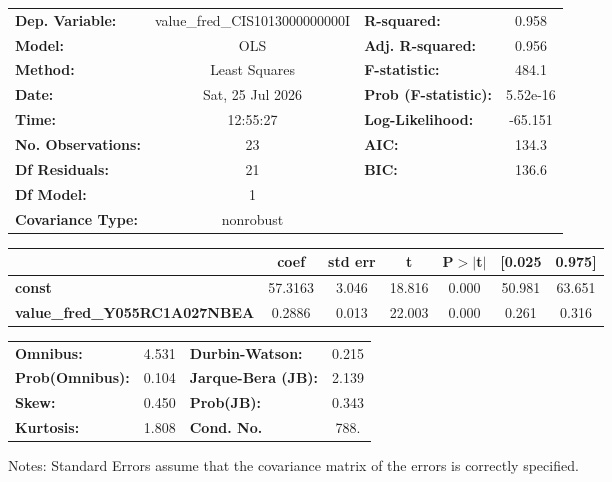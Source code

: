 \begin{center}
\begin{tabular}{lclc}
\toprule
\textbf{Dep. Variable:}               & value\_fred\_CIS1013000000000I & \textbf{  R-squared:         } &     0.958   \\
\textbf{Model:}                       &              OLS               & \textbf{  Adj. R-squared:    } &     0.956   \\
\textbf{Method:}                      &         Least Squares          & \textbf{  F-statistic:       } &     484.1   \\
\textbf{Date:}                        &        Sat, 25 Jul 2026        & \textbf{  Prob (F-statistic):} &  5.52e-16   \\
\textbf{Time:}                        &            12:55:27            & \textbf{  Log-Likelihood:    } &   -65.151   \\
\textbf{No. Observations:}            &                 23             & \textbf{  AIC:               } &     134.3   \\
\textbf{Df Residuals:}                &                 21             & \textbf{  BIC:               } &     136.6   \\
\textbf{Df Model:}                    &                  1             & \textbf{                     } &             \\
\textbf{Covariance Type:}             &           nonrobust            & \textbf{                     } &             \\
\bottomrule
\end{tabular}
\begin{tabular}{lcccccc}
                                      & \textbf{coef} & \textbf{std err} & \textbf{t} & \textbf{P$> |$t$|$} & \textbf{[0.025} & \textbf{0.975]}  \\
\midrule
\textbf{const}                        &      57.3163  &        3.046     &    18.816  &         0.000        &       50.981    &       63.651     \\
\textbf{value\_fred\_Y055RC1A027NBEA} &       0.2886  &        0.013     &    22.003  &         0.000        &        0.261    &        0.316     \\
\bottomrule
\end{tabular}
\begin{tabular}{lclc}
\textbf{Omnibus:}       &  4.531 & \textbf{  Durbin-Watson:     } &    0.215  \\
\textbf{Prob(Omnibus):} &  0.104 & \textbf{  Jarque-Bera (JB):  } &    2.139  \\
\textbf{Skew:}          &  0.450 & \textbf{  Prob(JB):          } &    0.343  \\
\textbf{Kurtosis:}      &  1.808 & \textbf{  Cond. No.          } &     788.  \\
\bottomrule
\end{tabular}
\end{center}

Notes: \newline
 [1] Standard Errors assume that the covariance matrix of the errors is correctly specified.